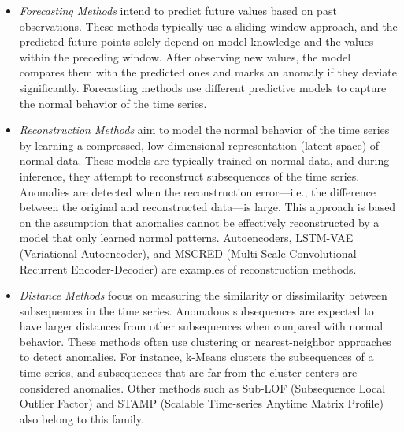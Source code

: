 \begin{itemize}
    \item \textit{Forecasting Methods} intend to predict future values based on past observations. These methods typically use a sliding window approach, and the predicted future points solely depend on model knowledge and the values within the preceding window. After observing new values, the model compares them with the predicted ones and marks an anomaly if they deviate significantly. Forecasting methods use different predictive models to capture the normal behavior of the time series.

    \item \textit{Reconstruction Methods} aim to model the normal behavior of the time series by learning a compressed, low-dimensional representation (latent space) of normal data. These models are typically trained on normal data, and during inference, they attempt to reconstruct subsequences of the time series. Anomalies are detected when the reconstruction error—i.e., the difference between the original and reconstructed data—is large. This approach is based on the assumption that anomalies cannot be effectively reconstructed by a model that only learned normal patterns. Autoencoders, LSTM-VAE (Variational Autoencoder), and MSCRED (Multi-Scale Convolutional Recurrent Encoder-Decoder) are examples of reconstruction methods.

    \item \textit{Distance Methods} focus on measuring the similarity or dissimilarity between subsequences in the time series. Anomalous subsequences are expected to have larger distances from other subsequences when compared with normal behavior. These methods often use clustering or nearest-neighbor approaches to detect anomalies. For instance, k-Means clusters the subsequences of a time series, and subsequences that are far from the cluster centers are considered anomalies. Other methods such as Sub-LOF (Subsequence Local Outlier Factor) and STAMP (Scalable Time-series Anytime Matrix Profile) also belong to this family.


\end{itemize}
